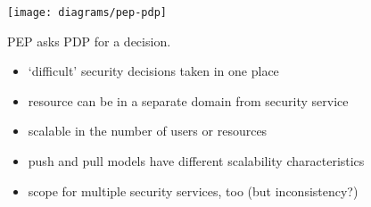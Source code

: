 \documentclass{sepslide-soa-faked} %
\begin{document}
\begin{slide}
\begin{flushleft}
\texttt{[image: diagrams/pep-pdp]}
\end{flushleft}
PEP asks PDP for a decision. 
\end{slide}

\begin{slide}
\begin{itemize}
  \item `difficult' security decisions taken in one place
  \item resource can be in a separate domain from security service
  \item scalable in the number of users or resources
  \item push and pull models have different scalability characteristics
  \item scope for multiple security services, too (but inconsistency?)
\end{itemize}
\end{slide}

\begin{slide}
  \Listofslides
\end{slide}

\begin{slide}
  \Timetable
\end{slide}
\end{document}
